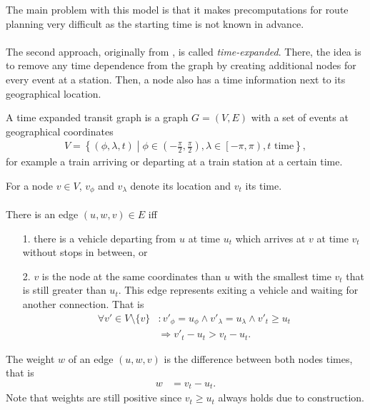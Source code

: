 	The main problem with this model is that it makes precomputations for route planning very difficult as
	the starting time is not known in advance.\\\\
	The second approach, originally from , is called \textit{time-expanded}.
	There, the idea is to remove any time dependence from the graph by creating additional nodes for every
	event at a station. Then, a node also has a time information next to its geographical location.
	\begin{mydef}\label{simpleTransitGraph}
		A \textnormal{time expanded transit graph} is a graph $G = (V, E)$ with a set of events at geographical coordinates
		\begin{align*}
			V = \left\{\left(\phi, \lambda, t\right) \middle| \phi \in \left(-\frac{\pi}{2}, \frac{\pi}{2}\right), \lambda \in \left[-\pi, \pi\right), t \text{ time}\right\},
		\end{align*}
		for example a train arriving or departing at a train station at a certain time.
		
		For a node $v \in V$, $v_\phi$ and $v_\lambda$ denote its location and $v_t$ its time.\\\\
		There is an edge $(u, w, v) \in E$ iff
		\begin{itemize}
			\item[1.] there is a vehicle departing from $u$ at time $u_t$ which arrives at $v$ at time $v_t$ without stops in between, or
			\item[2.] $v$ is the node at the same coordinates than $u$ with the smallest time $v_t$ that is still
				greater than $u_t$. This edge represents exiting a vehicle and waiting for another connection. That is
			\begin{align*}
				\forall v' \in V \setminus \{v\}	&: v'_\phi = u_\phi \land v'_\lambda = u_\lambda \land v'_t \ge u_t\\
									&\Rightarrow v'_t - u_t > v_t - u_t.
			\end{align*}
		\end{itemize}
		The weight $w$ of an edge $(u, w, v)$ is the difference between both nodes times, that is
		\begin{align*}
			w	&= v_t - u_t.
		\end{align*}
		Note that weights are still positive since $v_t \ge u_t$ always holds due to construction.
	\end{mydef}
